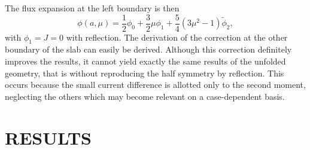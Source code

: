 \documentclass{ictt26}
\begin{document}
The flux expansion at the left boundary is then
\[ \phi(a, \mu) = \frac{1}{2} \phi_0 + \frac{3}{2} \mu \phi_1 + \frac{5}{4} \left( 3 \mu^2 - 1 \right) \tilde{\phi}_2, \]
with $\phi_1 = J = 0$ with reflection. The derivation of the correction at the other boundary of the slab can easily be derived. Although this correction definitely improves the results, it cannot yield exactly the same results of the unfolded geometry, that is without reproducing the half symmetry by reflection. This occurs because the small current difference is allotted only to the second moment, neglecting the others which may become relevant on a case-dependent basis.


\section{RESULTS}
\label{sec:res}

%
%
%
\end{document}
